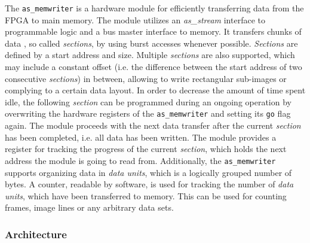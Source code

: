 The \texttt{as\_memwriter} is a hardware module for efficiently transferring data from the FPGA to main memory.
The module utilizes an \textit{as\_stream} interface to programmable logic and a bus master interface to memory.
It transfers chunks of data , so called \textit{sections}, by using burst accesses whenever possible.
\textit{Sections} are defined by a start address and size.
Multiple \textit{sections} are also supported, which may include a constant offset (i.e. the difference between the start address of two consecutive \textit{sections}) in between, allowing to write rectangular sub-images or complying to a certain data layout.
In order to decrease the amount of time spent idle, the following \textit{section} can be programmed during an ongoing operation by overwriting the hardware registers of the \texttt{as\_memwriter} and setting its \texttt{go} flag again.
The module proceeds with the next data transfer after the current \textit{section} has been completed, i.e. all data has been written.
The module provides a register for tracking the progress of the current \textit{section}, which holds the next address the module is going to read from.
Additionally, the \texttt{as\_memwriter} supports organizing data in \textit{data units}, which is a logically grouped number of bytes.
A counter, readable by software, is used for tracking the number of \textit{data units}, which have been transferred to memory.
This can be used for counting frames, image lines or any arbitrary data sets.

\subsubsection{Architecture}

